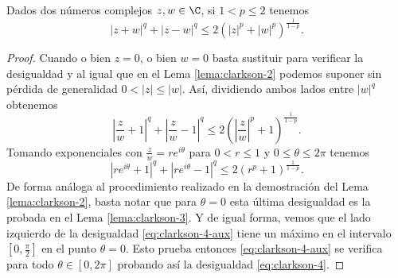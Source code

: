 \begin{lemma} \label{lema:clarkson-4}
    Dados dos números complejos $ z, w \in \C $, si $ 1 < p \leq 2 $ tenemos
    \begin{equation} \label{eq:clarkson-4}
        |z + w|^q + |z - w|^q \leq 2(|z|^p + |w|^p)^{\frac{1}{1-p}}.
    \end{equation}
\end{lemma}
\begin{proof}
    Cuando o bien $ z = 0 $, o bien $ w=0 $ basta sustituir para verificar la desigualdad y al igual que en el Lema \ref{lema:clarkson-2} podemos suponer sin pérdida de generalidad $ 0 < |z| \leq |w| $. Así, dividiendo ambos lados entre $ |w|^q $ obtenemos
    \begin{equation}
        \left|\frac{z}{w} + 1\right|^q + \left|\frac{z}{w} - 1\right|^q \leq 2\left( \left|\frac{z}{w} \right|^p + 1\right)^{\frac{1}{1-p}}.
    \end{equation}
    Tomando exponenciales con $ \frac{z}{w} = r e^{i \theta} $ para $ 0 <r \leq 1 $ y $ 0 \leq \theta \leq 2\pi $ tenemos
    \begin{equation} \label{eq:clarkson-4-aux}
        \left|r e^{i \theta} + 1\right|^q + \left|r e^{i \theta} - 1\right|^q \leq 2\left( r^p + 1\right)^{\frac{1}{1-p}}. 
    \end{equation}
    De forma análoga al procedimiento realizado en la demostración del Lema \ref{lema:clarkson-2}, basta notar que para $ \theta = 0 $ esta última desigualdad es la probada en el Lema \ref{lema:clarkson-3}. Y de igual forma, vemos que el lado izquierdo de la desigualdad \eqref{eq:clarkson-4-aux} tiene un máximo en el intervalo $ \left[0, \frac{\pi}{2} \right] $ en el punto $ \theta = 0 $. Esto prueba entonces \eqref{eq:clarkson-4-aux} se verifica para todo $ \theta \in \left[0, 2\pi \right] $ probando así la desigualdad \eqref{eq:clarkson-4}.
\end{proof}

